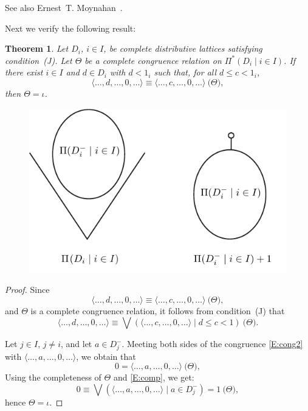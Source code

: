 \documentclass{amsart}
\newtheorem{theorem}{Theorem}
\begin{document}
See also Ernest~T. Moynahan~\cite{eM57a}.

Next we verify the following result:

\begin{theorem}\label{T:P*} 
Let $D_{i}$, $i \in I$, be complete distributive 
lattices satisfying condition~\textup{(J)}.  
Let $\Theta$ be a complete congruence relation on 
$\Pi^{*} ( D_{i} \mid i \in I )$. 
If there exist $i \in I$ and $d \in D_{i}$ with 
$d < 1_{i}$ such that, for all $d \leq c < 1_{i}$, 
\begin{equation}\label{E:cong1} 
   \langle \dots, d, \dots, 0, \dots \rangle \equiv 
   \langle \dots, c, \dots, 0, \dots \rangle 
   \pod{\Theta}, 
\end{equation}
then $\Theta = \iota$.
\end{theorem}

\begin{figure}[hbt]
\centering\includegraphics{products}
\caption{}\label{Fi:products}
\end{figure}

\begin{proof}
Since 
\begin{equation}\label{E:cong2}
\langle \dots, d, \dots, 0, \dots \rangle \equiv 
\langle \dots, c, \dots, 0, \dots \rangle 
\pod{\Theta}, 
\end{equation}
and $\Theta$ is a complete congruence relation, 
it follows from condition~(J) that
\begin{equation}\label{E:cong}
 \langle \dots, d, \dots, 0, \dots \rangle \equiv
 \bigvee ( \langle \dots, c, \dots, 0, \dots \rangle 
 \mid d \leq c < 1 ) \pod{\Theta}. 
\end{equation}

Let $j \in I$, $j \neq i$, and let $a \in D_{j}^{-}$. 
Meeting both sides of the congruence \eqref{E:cong2} 
with $\langle \dots, a, \dots, 0, \dots \rangle$, 
we obtain that
\begin{equation}\label{E:comp}
   0 = \langle \dots, a, \dots, 0, \dots \rangle 
     \pod{\Theta}, 
\end{equation}
Using the completeness of $\Theta$ and \eqref{E:comp}, 
we get:
\[
   0 \equiv \bigvee ( \langle \dots, a, \dots, 0, 
     \dots \rangle \mid a \in D_{j}^{-} ) = 1 
     \pod{\Theta}, 
\]
hence $\Theta = \iota$.
\end{proof}
\end{document}
